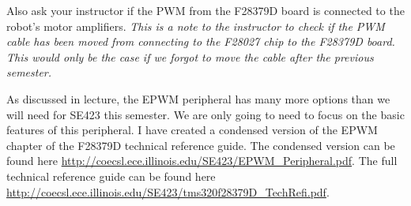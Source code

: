 \documentclass[11pt]{article}
\begin{document}
Also ask your instructor if the PWM from the F28379D board is connected to the robot’s motor amplifiers. \textit{This is a note to the instructor to check if the PWM cable has been moved from connecting to the F28027 chip to the F28379D board. This would only be the case if we forgot to move the cable after the previous semester.}

As discussed in lecture, the EPWM peripheral has many more options than we will need for SE423 this semester. We are only going to need to focus on the basic features of this peripheral. I have created a condensed version of the EPWM chapter of the F28379D technical reference guide. The condensed version can be found here \url{http://coecsl.ece.illinois.edu/SE423/EPWM_Peripheral.pdf}. The full technical reference guide can be found here \url{http://coecsl.ece.illinois.edu/SE423/tms320f28379D_TechRefi.pdf}.
\end{document}
